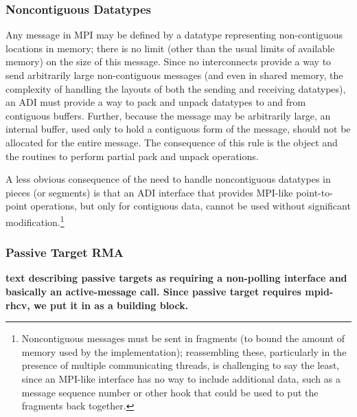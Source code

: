 \documentclass{article}
\begin{document}
\subsubsection{Noncontiguous Datatypes}
Any message in MPI may be defined by a datatype representing
non-contiguous locations in memory; there is no limit (other than the
usual limits of available memory) on the size of this message.  Since
no interconnects provide a way to send arbitrarily large
non-contiguous messages (and even in shared memory, the complexity of
handling the layouts of both the sending and receiving datatypes), an
ADI must provide a way to pack and unpack datatypes to and from
contiguous buffers.  
Further, because the message may be arbitrarily large, an internal
buffer,
used only to hold a contiguous form of the message, should
not be allocated for the entire message.
The consequence of this rule is the  object and the
routines to perform partial pack and unpack operations.

A less obvious consequence of the need to handle noncontiguous
datatypes in pieces (or segments) is that an ADI interface that
provides MPI-like point-to-point operations, but only for contiguous
data, cannot be used without significant modification.\footnote{Noncontiguous
  messages must be sent in fragments (to bound the amount of memory
  used by the implementation); reassembling these, particularly in the
  presence of multiple communicating threads, is challenging to say the least,
  since an MPI-like interface has no way to include additional data, such as a
  message sequence number or other hook that could be used to put the
  fragments back together.}


\subsubsection{Passive Target RMA}
\label{sec-passive-target}
\textbf{text describing passive targets as requiring a non-polling
interface and basically an active-message call.  Since passive target
requires mpid-rhcv, we put it in as a building block.}
\end{document}
